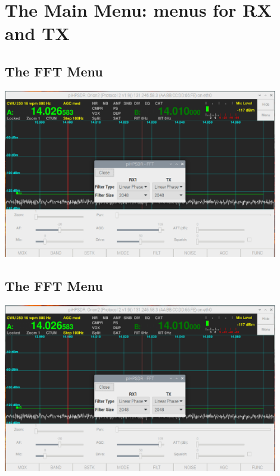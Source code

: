 \documentclass[12pt]{book}
\begin{document}
\chapter{The Main Menu: menus for RX and TX}

\section{The FFT Menu}
\begin{center}
\includegraphics[width=12cm]{FFTMenu.png}
\end{center}

\section{The FFT Menu}
\begin{center}
\includegraphics[width=12cm]{FFTMenu.png}
\end{center}
\end{document}
